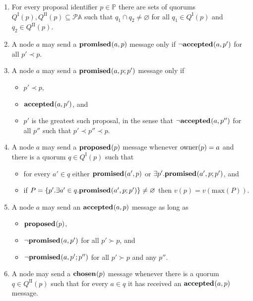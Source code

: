 \documentclass[journal]{IEEEtran}
\begin{document}
\begin{enumerate}

\item \label{synod-quorums} For every proposal identifier $p \in \mathbb P$
there are sets of quorums $Q^\textrm{I}(p), Q^\textrm{II}(p) \subseteq \mathcal
P \mathbb A$ such that $q_1 \cap q_2 \ne \varnothing$ for all $q_1 \in
Q^\textrm{I}(p)$ and $q_2 \in Q^\textrm{II}(p)$.

\item \label{synod-fprom} A node $a$ may send a $\mathbf{promised}_{}(a,p)$ message only if
$\neg\mathbf{accepted}_{}(a,p')$ for all $p' \prec p$.

\item \label{synod-bprom} A node $a$ may send a $\mathbf{promised}_{}(a,p;p')$ message only
if
\begin{itemize}
\item $p' \prec p$,
\item $\mathbf{accepted}_{}(a,p')$, and
\item $p'$ is the greatest such proposal, in the sense that $\neg\mathbf{accepted}_{}(a,p'')$
for all $p''$ such that $p' \prec p'' \prec p$.
\end{itemize}

\item \label{synod-prop} A node $a$ may send a $\mathbf{proposed}_{}(p)$ message whenever
$\mathrm{owner}(p) = a$ and there is a quorum $q \in Q^\textrm{I}(p)$ such that
\begin{itemize}
\item for every $a' \in q$ either $\mathbf{promised}_{}(a',p)$ or $\exists p'.
\mathbf{promised}_{}(a',p;p')$, and
\item if $P = \{ p'. \exists a' \in q. \mathbf{promised}_{}(a',p;p') \} \ne \varnothing$
then $v(p) = v(\mathrm{max}(P))$.
\end{itemize}

\item \label{synod-acc} A node $a$ may send an $\mathbf{accepted}_{}(a,p)$ message as long as

\begin{itemize}
\item $\mathbf{proposed}_{}(p)$,
\item $\neg\mathbf{promised}_{}(a,p')$ for all $p' \succ p$, and
\item $\neg\mathbf{promised}_{}(a,p';p'')$ for all $p' \succ p$ and any $p''$.
\end{itemize}

\item \label{synod-chosen} A node may send a $\mathbf{chosen}_{}(p)$ message whenever
there is a quorum $q \in Q^\textrm{II}(p)$ such that for every $a \in q$ it has
received an $\mathbf{accepted}_{}(a,p)$ message.

\end{enumerate}
\end{document}
